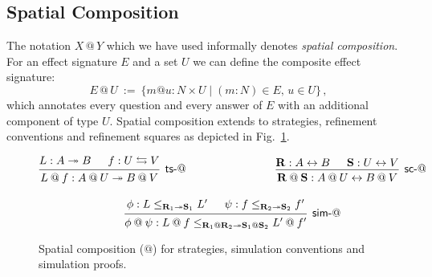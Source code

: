 
\subsection{Spatial Composition} \label{sec:scomp} %

The notation $X \mathbin@ Y$ which we have used informally
denotes \emph{spatial composition}.
For an effect signature $E$ and a set $U$
we can define the composite effect signature:
\[
  E \mathbin@ U \: := \:
    \{ m @ u : N \times U \mid (m : N) \in E, \, u \in U \}
  \,,
\]
which annotates every question and every answer of $E$
with an additional component of type $U$.
Spatial composition extends to strategies,
refinement conventions and refinement squares
as depicted in Fig.~\ref{fig:xcomp}.

\begin{figure} %
  \begin{gather*}
    \begin{prooftree}
      \hypo{L : A \twoheadrightarrow B}
      \hypo{f : U \lensarrow V}
      \infer2[\kw{ts}-$\mathbin@$]{
        L \mathbin@ f : A \mathbin@ U \twoheadrightarrow B \mathbin@ V
      }
    \end{prooftree}
    \hspace{8em}
    \begin{prooftree}
      \hypo{\mathbf{R} : A \leftrightarrow B}
      \hypo{\mathbf{S} : U \leftrightarrow V}
      \infer2[\kw{sc}-$\mathbin@$]{
        \mathbf{R} \mathbin@ \mathbf{S} : A \mathbin@ U \leftrightarrow B \mathbin@ V
      }
    \end{prooftree}
    \\[1em]
    \begin{prooftree}
      \hypo{\phi: L \le_{\mathbf{R}_1 \twoheadrightarrow \mathbf{S}_1} L'}
      \hypo{\psi: f \le_{\mathbf{R}_2 \twoheadrightarrow \mathbf{S}_2} f'}
      \infer2[\kw{sim}-$\mathbin@$]{\phi \mathbin@ \psi :
	L \mathbin@ f
        \le_{\mathbf{R}_1 \mathbin@ \mathbf{R}_2 \twoheadrightarrow
             \mathbf{S}_1 \mathbin@ \mathbf{S}_2}
	L' \mathbin@ f'}
    \end{prooftree}
  \end{gather*}
  \caption{Spatial composition ($\mathbin@$) for strategies,
    simulation conventions and simulation proofs.}
  \label{fig:xcomp}
\end{figure}

